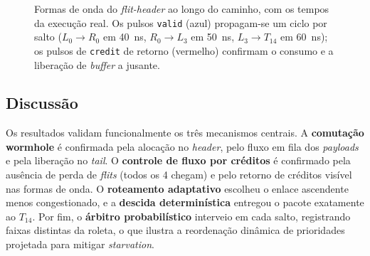 \documentclass[conference]{IEEEtran}
\begin{document}
\begin{figure}[!t]
\centering
{}
\caption{Formas de onda do \emph{flit-header} ao longo do caminho, com os tempos
da execução real. Os pulsos \texttt{valid} (azul) propagam-se um ciclo por salto
($L_0\!\to\!R_0$ em \SI{40}{ns}, $R_0\!\to\!L_3$ em \SI{50}{ns},
$L_3\!\to\!T_{14}$ em \SI{60}{ns}); os pulsos de \texttt{credit} de retorno
(vermelho) confirmam o consumo e a liberação de \emph{buffer} a jusante.}
\label{fig:wave}
\end{figure}

\subsection{Discussão}
Os resultados validam funcionalmente os três mecanismos centrais. A
\textbf{comutação wormhole} é confirmada pela alocação no \emph{header}, pelo
fluxo em fila dos \emph{payloads} e pela liberação no \emph{tail}. O
\textbf{controle de fluxo por créditos} é confirmado pela ausência de perda de
\emph{flits} (todos os 4 chegam) e pelo retorno de créditos visível nas formas de
onda. O \textbf{roteamento adaptativo} escolheu o enlace ascendente menos
congestionado, e a \textbf{descida determinística} entregou o pacote exatamente
ao $T_{14}$. Por fim, o \textbf{árbitro probabilístico} interveio em cada salto,
registrando faixas distintas da roleta, o que ilustra a reordenação dinâmica de
prioridades projetada para mitigar \emph{starvation}.
\end{document}
